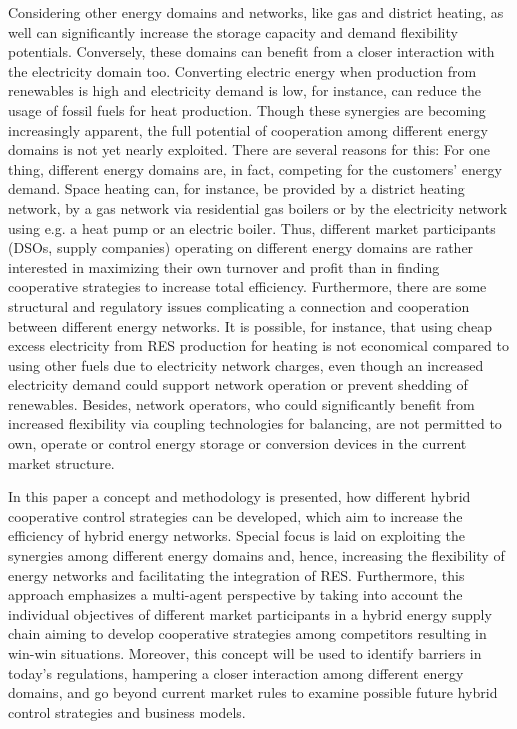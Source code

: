 \documentclass[conference]{IEEEtran}
\begin{document}
Considering other energy domains and networks, like gas and district
heating, as well can significantly increase the storage capacity and
demand flexibility potentials. Conversely, these domains can benefit
from a closer interaction with the electricity domain too. Converting
electric energy when production from renewables is high and
electricity demand is low, for instance, can reduce the usage of
fossil fuels for heat production. Though these synergies are becoming
increasingly apparent, the full potential of cooperation among
different energy domains is not yet nearly exploited. There are
several reasons for this: For one thing, different energy domains are,
in fact, competing for the customers’ energy demand. Space heating
can, for instance, be provided by a district heating network, by a gas
network via residential gas boilers or by the electricity network
using e.g. a heat pump or an electric boiler. Thus, different market
participants (DSOs, supply companies) operating on different energy
domains are rather interested in maximizing their own turnover and
profit than in finding cooperative strategies to increase total
efficiency. Furthermore, there are some structural and regulatory
issues complicating a connection and cooperation between different
energy networks. It is possible, for instance, that using cheap excess
electricity from RES production for heating is not economical compared
to using other fuels due to electricity network charges, even though
an increased electricity demand could support network operation or
prevent shedding of renewables. Besides, network operators, who could
significantly benefit from increased flexibility via coupling
technologies for balancing, are not permitted to own, operate or
control energy storage or conversion devices in the current market
structure. 

In this paper a concept and methodology is presented, how different
hybrid cooperative control strategies can be developed, which aim to
increase the efficiency of hybrid energy networks. Special focus is
laid on exploiting the synergies among different energy domains and,
hence, increasing the flexibility of energy networks and facilitating
the integration of RES. Furthermore, this approach emphasizes a
multi-agent perspective by taking into account the individual
objectives of different market participants in a hybrid energy supply
chain aiming to develop cooperative strategies among competitors
resulting in win-win situations. Moreover, this concept will be used
to identify barriers in today’s regulations, hampering a closer
interaction among different energy domains, and go beyond current
market rules to examine possible future hybrid control strategies and
business models.
\end{document}
